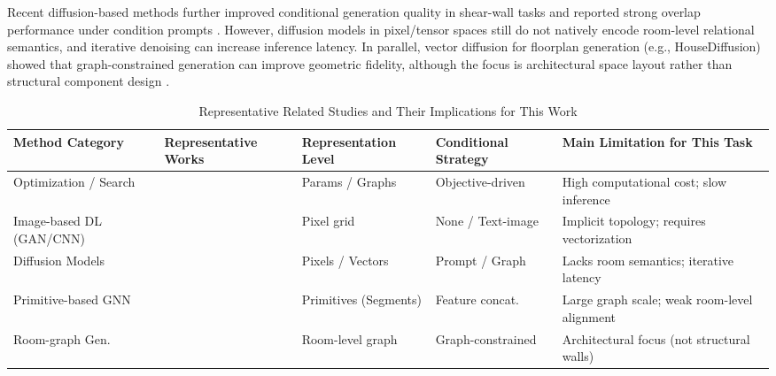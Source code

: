 Recent diffusion-based methods further improved conditional generation quality in shear-wall tasks and reported strong overlap performance under condition prompts \cite{guIntelligentDesignShear2024,zhouStructDiffusionEndendIntelligent2024}. However, diffusion models in pixel/tensor spaces still do not natively encode room-level relational semantics, and iterative denoising can increase inference latency. In parallel, vector diffusion for floorplan generation (e.g., HouseDiffusion) showed that graph-constrained generation can improve geometric fidelity, although the focus is architectural space layout rather than structural component design \cite{shabaniHouseDiffusionVectorFloorplan2022,liFrameDiffusionLatentDiffusion2025}.

\begin{table}[t]
\centering
\caption{Representative Related Studies and Their Implications for This Work}
\label{tab:related_work}
\small
\setlength{\tabcolsep}{4pt}
\begin{tabularx}{\textwidth}{
>{\raggedright\arraybackslash}p{2.8cm}
>{\raggedright\arraybackslash}p{2.35cm}
>{\raggedright\arraybackslash}p{2.4cm}
>{\raggedright\arraybackslash\hsize=0.9\hsize}X
>{\raggedright\arraybackslash\hsize=1.1\hsize}X
}
\toprule
Method Category & Representative Works & Representation Level & Conditional Strategy & Main Limitation for This Task \\
\midrule
Optimization / Search & \cite{zhouAutomatedStructuralDesign2022b,muellerCombiningStructuralPerformance2015,luoAlphaTrussMonteCarlo2022a} & Params / Graphs & Objective-driven & High computational cost; slow inference \\
Image-based DL (GAN/CNN) & \cite{liaoAutomatedStructuralDesign2021a,liaoIntelligentGenerativeStructural2022a,luIntelligentStructuralDesign2022a,fuDualGenerativeAdversarial2023} & Pixel grid & None / Text-image & Implicit topology; requires vectorization \\
Diffusion Models & \cite{guIntelligentDesignShear2024, zhouStructDiffusionEndendIntelligent2024,shabaniHouseDiffusionVectorFloorplan2022} & Pixels / Vectors & Prompt / Graph & Lacks room semantics; iterative latency \\
Primitive-based GNN & \cite{zhaoIntelligentDesignShear2023b,zhaoDesignconditioninformedShearWall2023d,IntelligentCodesignShear2025,zhangEndtoendGenerationStructural} & Primitives (Segments) & Feature concat. & Large graph scale; weak room-level alignment \\
Room-graph Gen. & \cite{nauataHouseGANRelationalGenerative2020} & Room-level graph & Graph-constrained & Architectural focus (not structural walls) \\
\bottomrule
\end{tabularx}
\end{table}

